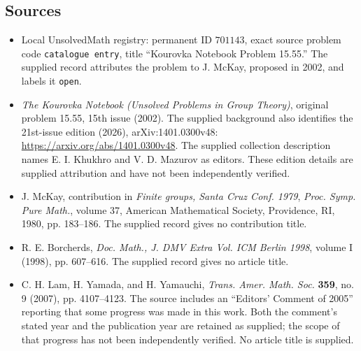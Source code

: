 \documentclass[11pt]{article}
\begin{document}
\subsection{Sources}
\begin{itemize}
\item Local UnsolvedMath registry: permanent ID \(701143\), exact source problem code \texttt{catalogue entry}, title ``Kourovka Notebook Problem 15.55.'' The supplied record attributes the problem to J. McKay, proposed in 2002, and labels it \texttt{open}.
\item \emph{The Kourovka Notebook (Unsolved Problems in Group Theory)}, original problem 15.55, 15th issue (2002). The supplied background also identifies the 21st-issue edition (2026), arXiv:1401.0300v48: \url{https://arxiv.org/abs/1401.0300v48}. The supplied collection description names E. I. Khukhro and V. D. Mazurov as editors. These edition details are supplied attribution and have not been independently verified.
\item J. McKay, contribution in \emph{Finite groups, Santa Cruz Conf. 1979}, \emph{Proc. Symp. Pure Math.}, volume 37, American Mathematical Society, Providence, RI, 1980, pp. 183--186. The supplied record gives no contribution title.
\item R. E. Borcherds, \emph{Doc. Math., J. DMV Extra Vol. ICM Berlin 1998}, volume I (1998), pp. 607--616. The supplied record gives no article title.
\item C. H. Lam, H. Yamada, and H. Yamauchi, \emph{Trans. Amer. Math. Soc.} \textbf{359}, no. 9 (2007), pp. 4107--4123. The source includes an ``Editors' Comment of 2005'' reporting that some progress was made in this work. Both the comment's stated year and the publication year are retained as supplied; the scope of that progress has not been independently verified. No article title is supplied.
\end{itemize}
\end{document}
